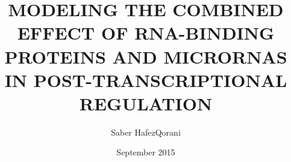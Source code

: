 \documentclass[11pt,single,chaparabic,ceng,ms,eng]{metu}
\author{Saber HafezQorani}
\title{MODELING THE COMBINED EFFECT OF RNA-BINDING PROTEINS AND MICRORNAS IN POST-TRANSCRIPTIONAL REGULATION}
\date{September 2015}
\begin{document}
\begin{preliminaries}
\end{preliminaries}
%
%
%





%


\appendix


%
\end{document}
